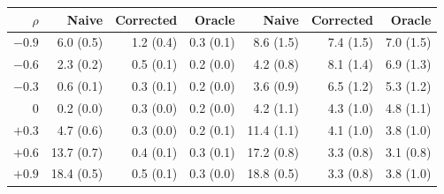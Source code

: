 \begin{tabular}{rrrrrrr}
\toprule
$\rho$ & Naive & Corrected & Oracle & Naive & Corrected & Oracle \\
\midrule
$-0.9$ & 6.0 (0.5) & 1.2 (0.4) & 0.3 (0.1) & 8.6 (1.5) & 7.4 (1.5) & 7.0 (1.5) \\
$-0.6$ & 2.3 (0.2) & 0.5 (0.1) & 0.2 (0.0) & 4.2 (0.8) & 8.1 (1.4) & 6.9 (1.3) \\
$-0.3$ & 0.6 (0.1) & 0.3 (0.1) & 0.2 (0.0) & 3.6 (0.9) & 6.5 (1.2) & 5.3 (1.2) \\
0 & 0.2 (0.0) & 0.3 (0.0) & 0.2 (0.0) & 4.2 (1.1) & 4.3 (1.0) & 4.8 (1.1) \\
$+0.3$ & 4.7 (0.6) & 0.3 (0.0) & 0.2 (0.1) & 11.4 (1.1) & 4.1 (1.0) & 3.8 (1.0) \\
$+0.6$ & 13.7 (0.7) & 0.4 (0.1) & 0.3 (0.1) & 17.2 (0.8) & 3.3 (0.8) & 3.1 (0.8) \\
$+0.9$ & 18.4 (0.5) & 0.5 (0.1) & 0.3 (0.0) & 18.8 (0.5) & 3.3 (0.8) & 3.8 (1.0) \\
\bottomrule
\end{tabular}
